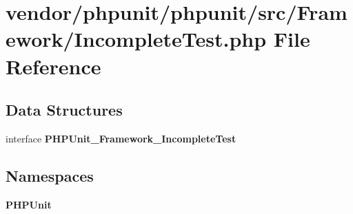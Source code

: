 \section{vendor/phpunit/phpunit/src/\+Framework/\+Incomplete\+Test.php File Reference}
\label{src_2_framework_2_incomplete_test_8php}
\subsection*{Data Structures}
\begin{DoxyCompactItemize}
\item 
interface {\bf P\+H\+P\+Unit\+\_\+\+Framework\+\_\+\+Incomplete\+Test}
\end{DoxyCompactItemize}
\subsection*{Namespaces}
\begin{DoxyCompactItemize}
\item 
 {\bf P\+H\+P\+Unit}
\end{DoxyCompactItemize}
